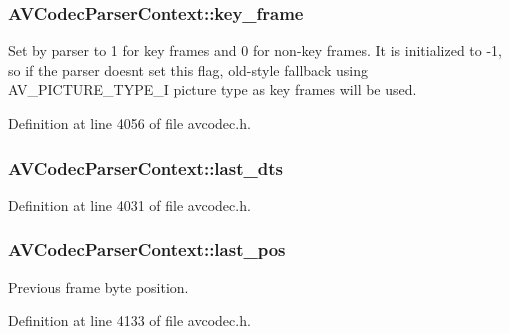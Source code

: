 \subsubsection[{\texorpdfstring{key\+\_\+frame}{key_frame}}]{ A\+V\+Codec\+Parser\+Context\+::key\+\_\+frame}\hypertarget{struct_a_v_codec_parser_context_ac115e048335e4a7f1d85541cebcf2013}{}\label{struct_a_v_codec_parser_context_ac115e048335e4a7f1d85541cebcf2013}
Set by parser to 1 for key frames and 0 for non-\/key frames. It is initialized to -\/1, so if the parser doesn\textquotesingle{}t set this flag, old-\/style fallback using A\+V\+\_\+\+P\+I\+C\+T\+U\+R\+E\+\_\+\+T\+Y\+P\+E\+\_\+I picture type as key frames will be used. 

Definition at line 4056 of file avcodec.\+h.

\subsubsection[{\texorpdfstring{last\+\_\+dts}{last_dts}}]{ A\+V\+Codec\+Parser\+Context\+::last\+\_\+dts}\hypertarget{struct_a_v_codec_parser_context_a6f05a770622ba8c068d37752fec72eca}{}\label{struct_a_v_codec_parser_context_a6f05a770622ba8c068d37752fec72eca}


Definition at line 4031 of file avcodec.\+h.

\subsubsection[{\texorpdfstring{last\+\_\+pos}{last_pos}}]{ A\+V\+Codec\+Parser\+Context\+::last\+\_\+pos}\hypertarget{struct_a_v_codec_parser_context_ad35a0f678d317123f179f3c73d63271d}{}\label{struct_a_v_codec_parser_context_ad35a0f678d317123f179f3c73d63271d}
Previous frame byte position. 

Definition at line 4133 of file avcodec.\+h.

